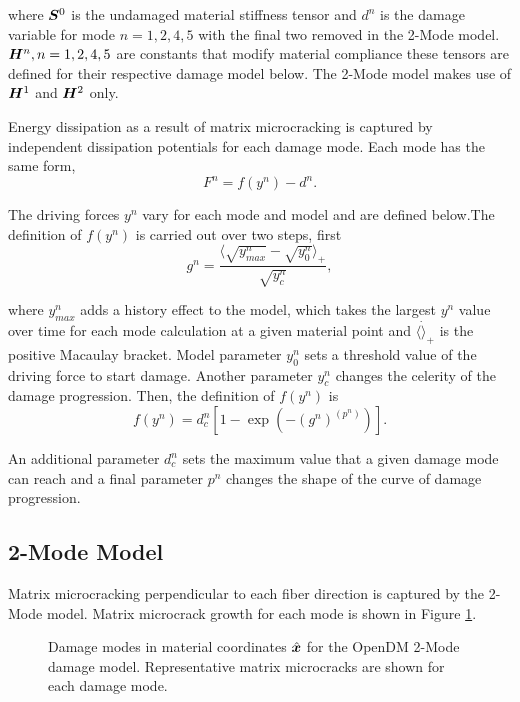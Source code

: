 \documentclass[11pt]{article}
\begin{document}
where \(\bm{S}^0\) is the undamaged material stiffness tensor and
\(d^n\) is the damage variable for mode \(n=1,2,4,5\) with the final two
removed in the 2-Mode model. \(\bm{H}^n, n=1,2,4,5\) are constants
that modify material compliance these tensors are defined for their
respective damage model below. The 2-Mode model makes use of
\(\bm{H}^1\) and \(\bm{H}^2\) only.

Energy dissipation as a result of matrix microcracking is captured by
independent dissipation potentials for each damage mode. Each mode has
the same form,
\begin{equation}
  \label{eq:OpenDM_DamagePotential}
  F^n = f(y^n) - d^n.
\end{equation}

The driving forces \(y^n\) vary for each mode and model and are defined
below.The definition of \(f(y^n)\) is carried out over two steps, first
\begin{equation}
  \label{eq:OpenDM_gVals}
  g^n =
  \frac{\langle \sqrt{y_{max}^n} - \sqrt{y_0^n}\rangle_+}{
  \sqrt{y_c^n}},
\end{equation}

where \(y_{max}^n\) adds a history effect to the model, which takes the
largest \(y^n\) value over time for each mode calculation at a given
material point and \(\langle \dot \rangle_+\) is the positive Macaulay
bracket. Model parameter \(y_0^n\) sets a threshold
value of the driving force to start damage. Another parameter \(y_c^n\)
changes the celerity of the damage progression. Then, the definition
of \(f(y^n)\) is
\begin{equation}
  \label{eq:OpenDM_DamageEvol}
  f(y^n) = d_c^n [1 - \exp(-(g^n)^{(p^n)})].
\end{equation}

An additional parameter \(d_c^n\) sets the maximum value that a given
damage mode can reach and a final parameter \(p^n\) changes the shape of
the curve of damage progression.

\subsection{2-Mode Model}
\label{sec:orga8f17f0}
Matrix microcracking perpendicular to each fiber direction is captured
by the 2-Mode model. Matrix microcrack growth for each mode is shown
in Figure \ref{fig:OpenDM2_DamageModes}.
\begin{figure}[h!]
  \centering
  \def\svgwidth{0.5\linewidth}
  
  \caption{Damage modes in material coordinates $\hat{\bm{x}}$ for the OpenDM 2-Mode
    damage model. Representative matrix microcracks are shown for each
    damage mode.}
  \label{fig:OpenDM2_DamageModes}
\end{figure}
\end{document}
